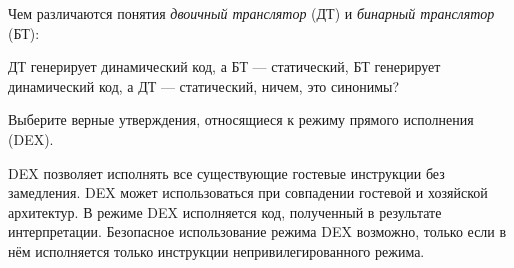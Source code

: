 \begin{questions}
\question[3] Чем различаются понятия \textit{двоичный транслятор} (ДТ) и \textit{бинарный транслятор} (БТ):
\begin{choices}
    \choice ДТ генерирует динамический код, а БТ --- статический,
    \choice БТ генерирует динамический код, а ДТ --- статический,
    \correctchoice ничем, это синонимы?
\end{choices}

\question[3] Выберите верные утверждения, относящиеся к режиму прямого исполнения (DEX).
\begin{choices}
\choice DEX позволяет исполнять все существующие гостевые инструкции без замедления.
\correctchoice DEX может использоваться при совпадении гостевой и хозяйской архитектур.
\choice В режиме DEX исполняется код, полученный в результате интерпретации.
\correctchoice Безопасное использование режима DEX возможно, только если в нём исполняется только инструкции непривилегированного режима.
\end{choices}


\end{questions}


% 
% 
% 
% 
% 
% 
% 
%         
% 


 
 